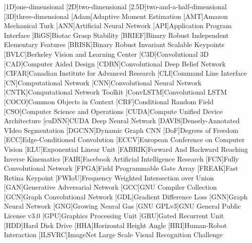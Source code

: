 \begin{acronym}
	[1D]{one-dimensional}
	[2D]{two-dimensional}
	[2.5D]{two-and-a-half-dimensional}
	[3D]{three-dimensional}
	[Adam]{Adaptive Moment Estimation}
	[AMT]{Amazon Mechanical Turk}
	[ANN]{Artificial Neural Network}
    [API]{Application Program Interface}
    [BiGS]{Biotac Grasp Stability}
	[BRIEF]{Binary Robust Independent Elementary Features}
	[BRISK]{Binary Robust Invariant Scalable Keypoints}
    [BVLC]{Berkeley Vision and Learning Center}
    [C3D]{Convolutional 3D}
	[CAD]{Computer Aided Design}
	[CDBN]{Convolutional Deep Belief Network}
	[CIFAR]{Canadian Institute for Advanced Research}
	[CLI]{Command Line Interface}
	[CN]{Computational Network}
	[CNN]{Convolutional Neural Network}
    [CNTK]{Computational Network Toolkit}
    [ConvLSTM]{Convolutional LSTM}
    [COCO]{Common Objects in Context}
    [CRF]{Conditional Random Field}
	[CSO]{Computer Science and Operations}
	[CUDA]{Compute Unified Device Architecture}
    [cuDNN]{CUDA Deep Neural Network}
    [DAVIS]{Densely-Annotated VIdeo Segmentation}
    [DGCNN]{Dynamic Graph CNN}
    [DoF]{Degrees of Freedom}
    [ECC]{Edge-Conditioned Convolution}
    [ECCV]{European Conference on Computer Vision}
    [ELU]{Exponential Linear Unit}
    [FABRIK]{Forward And Backward Reaching Inverse Kinematics}
    [FAIR]{Facebook Artificial Intelligence Research}
    [FCN]{Fully Convolutional Network}
    [FPGA]{Field Programmable Gate Array}
    [FREAK]{Fast Retina Keypoint}
    [FWIoU]{Frequency Weighted Intersection over Union}
    [GAN]{Generative Adversarial Network}
    [GCC]{GNU Compiler Collection}
    [GCN]{Graph Convolutional Network}
    [GDL]{Gradient Difference Loss}
    [GNN]{Graph Neural Network}
    [GNG]{Growing Neural Gas}
	[GNU GPLv3]{GNU General Public License v3.0}
    [GPU]{Graphics Processing Unit}
    [GRU]{Gated Recurrent Unit}
    [HDD]{Hard Disk Drive}
    [HHA]{Horizontal Height Angle}
    [HRI]{Human-Robot Interaction}
    [ILSVRC]{ImageNet Large Scale Visual Recognition Challenge}

\end{acronym}
